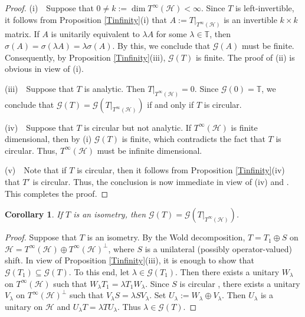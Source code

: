 \documentclass[a4paper,oneside,10pt, reqno]{amsproc}
\newtheorem{corollary}[theorem]{Corollary}%
\theoremstyle{remark}
\theoremstyle{definition}
\begin{document}
\begin{proof}
(i)\ \ Suppose that $0 \ne k := \dim T^\infty(\mathcal H) < \infty$. Since $T$ is left-invertible, it follows from Proposition \ref{Tinfinity}(i) that $A := T|_{T^\infty(\mathcal H)}$ is an invertible $k \times k$ matrix. If $A$ is unitarily equivalent to $\lambda A$ for some $\lambda \in \mathbb T$, then $\sigma(A) = \sigma(\lambda A) = \lambda \sigma(A)$. By this, we conclude that $\mathcal G(A)$ must be finite. Consequently, by Proposition \ref{Tinfinity}(iii), $\mathcal G(T)$ is finite. The proof of (ii) is obvious in view of (i).

(iii)\ \ Suppose that $T$ is analytic. Then $T|_{T^\infty(\mathcal H)} = 0$. Since $\mathcal G(0) = \mathbb T$, we conclude that $\mathcal G(T) = \mathcal G(T|_{T^\infty(\mathcal H)})$ if and only if $T$ is circular.

(iv)\ \ Suppose that $T$ is circular but not analytic. If $T^\infty(\mathcal H)$ is finite dimensional, then by (i) $\mathcal G(T)$ is finite, which contradicts the fact that $T$ is circular. Thus, $T^\infty(\mathcal H)$ must be infinite dimensional. 

(v)\ \ Note that if $T$ is circular, then it follows from Proposition \ref{Tinfinity}(iv) that $T'$ is circular. Thus, the conclusion is now immediate in view of (iv) and \cite[Proposition 2.7]{S}. This completes the proof.
\end{proof}

\begin{corollary}
If $T$ is an isometry, then $\mathcal G(T) = \mathcal G(T|_{T^\infty(\mathcal H)})$.
\end{corollary}

\begin{proof}
Suppose that $T$ is an isometry. By the Wold decomposition, $T = T_1 \oplus S$ on $\mathcal H = T^\infty(\mathcal H) \oplus T^\infty(\mathcal H)^\bot$, where $S$ is a unilateral (possibly operator-valued) shift. In view of Proposition \ref{Tinfinity}(iii), it is enough to show that $\mathcal G(T_1) \subseteq \mathcal G(T)$. To this end, let $\lambda \in \mathcal G(T_1)$. Then there exists a unitary $W_\lambda$ on $T^\infty(\mathcal H)$ such that $W_\lambda T_1 = \lambda T_1 W_\lambda$. Since $S$ is circular \cite[Proposition 4.1]{GKT}, there exists a unitary $V_\lambda$ on $T^\infty(\mathcal H)^\bot$ such that $V_\lambda S = \lambda S V_\lambda$. Set $U_\lambda := W_\lambda \oplus V_\lambda$. Then $U_\lambda$ is a unitary on $\mathcal H$ and $U_\lambda T = \lambda T U_\lambda$. Thus $\lambda \in \mathcal G(T)$. 
\end{proof}
\end{document}

